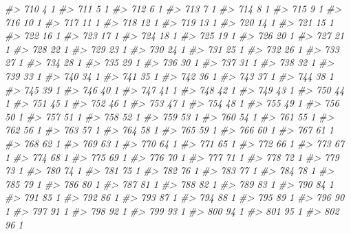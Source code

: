 \documentclass[]{article}
\newenvironment{Shaded}{\begin{snugshade}}{\end{snugshade}}
\newcommand{\CommentTok}[1]{\textcolor[rgb]{0.56,0.35,0.01}{\textit{#1}}}
\begin{document}
\begin{Shaded}
\begin{Highlighting}[]
\CommentTok{#> 710    4  1}
\CommentTok{#> 711    5  1}
\CommentTok{#> 712    6  1}
\CommentTok{#> 713    7  1}
\CommentTok{#> 714    8  1}
\CommentTok{#> 715    9  1}
\CommentTok{#> 716   10  1}
\CommentTok{#> 717   11  1}
\CommentTok{#> 718   12  1}
\CommentTok{#> 719   13  1}
\CommentTok{#> 720   14  1}
\CommentTok{#> 721   15  1}
\CommentTok{#> 722   16  1}
\CommentTok{#> 723   17  1}
\CommentTok{#> 724   18  1}
\CommentTok{#> 725   19  1}
\CommentTok{#> 726   20  1}
\CommentTok{#> 727   21  1}
\CommentTok{#> 728   22  1}
\CommentTok{#> 729   23  1}
\CommentTok{#> 730   24  1}
\CommentTok{#> 731   25  1}
\CommentTok{#> 732   26  1}
\CommentTok{#> 733   27  1}
\CommentTok{#> 734   28  1}
\CommentTok{#> 735   29  1}
\CommentTok{#> 736   30  1}
\CommentTok{#> 737   31  1}
\CommentTok{#> 738   32  1}
\CommentTok{#> 739   33  1}
\CommentTok{#> 740   34  1}
\CommentTok{#> 741   35  1}
\CommentTok{#> 742   36  1}
\CommentTok{#> 743   37  1}
\CommentTok{#> 744   38  1}
\CommentTok{#> 745   39  1}
\CommentTok{#> 746   40  1}
\CommentTok{#> 747   41  1}
\CommentTok{#> 748   42  1}
\CommentTok{#> 749   43  1}
\CommentTok{#> 750   44  1}
\CommentTok{#> 751   45  1}
\CommentTok{#> 752   46  1}
\CommentTok{#> 753   47  1}
\CommentTok{#> 754   48  1}
\CommentTok{#> 755   49  1}
\CommentTok{#> 756   50  1}
\CommentTok{#> 757   51  1}
\CommentTok{#> 758   52  1}
\CommentTok{#> 759   53  1}
\CommentTok{#> 760   54  1}
\CommentTok{#> 761   55  1}
\CommentTok{#> 762   56  1}
\CommentTok{#> 763   57  1}
\CommentTok{#> 764   58  1}
\CommentTok{#> 765   59  1}
\CommentTok{#> 766   60  1}
\CommentTok{#> 767   61  1}
\CommentTok{#> 768   62  1}
\CommentTok{#> 769   63  1}
\CommentTok{#> 770   64  1}
\CommentTok{#> 771   65  1}
\CommentTok{#> 772   66  1}
\CommentTok{#> 773   67  1}
\CommentTok{#> 774   68  1}
\CommentTok{#> 775   69  1}
\CommentTok{#> 776   70  1}
\CommentTok{#> 777   71  1}
\CommentTok{#> 778   72  1}
\CommentTok{#> 779   73  1}
\CommentTok{#> 780   74  1}
\CommentTok{#> 781   75  1}
\CommentTok{#> 782   76  1}
\CommentTok{#> 783   77  1}
\CommentTok{#> 784   78  1}
\CommentTok{#> 785   79  1}
\CommentTok{#> 786   80  1}
\CommentTok{#> 787   81  1}
\CommentTok{#> 788   82  1}
\CommentTok{#> 789   83  1}
\CommentTok{#> 790   84  1}
\CommentTok{#> 791   85  1}
\CommentTok{#> 792   86  1}
\CommentTok{#> 793   87  1}
\CommentTok{#> 794   88  1}
\CommentTok{#> 795   89  1}
\CommentTok{#> 796   90  1}
\CommentTok{#> 797   91  1}
\CommentTok{#> 798   92  1}
\CommentTok{#> 799   93  1}
\CommentTok{#> 800   94  1}
\CommentTok{#> 801   95  1}
\CommentTok{#> 802   96  1}

\end{Highlighting}
\end{Shaded}
\end{document}
